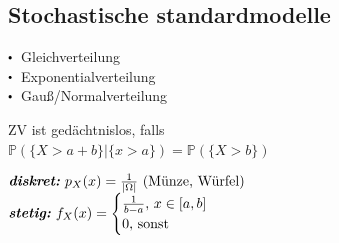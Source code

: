\documentclass[8pt,a4paper,landscape]{extarticle}
\begin{document}
\begin{multicols*}{6}
\section{Stochastische standardmodelle}
%
\vspace{-5pt}
{
\par
$\sbullet$ Gleichverteilung \\
$\sbullet$ Exponentialverteilung \\
$\sbullet$ Gauß/Normalverteilung \\
}
%
\vspace{35pt}
\par
ZV ist gedächtnislos, falls \\ {\color{orange} $\mathbb{P}(\{X > a + b\} | \{x > a\}) = \mathbb{P}(\{X > b\})$}








\columnbreak
\vspace*{-10pt}
\par\noindent 
{}
%
\vspace*{6pt}
\par
  \begingroup
    \setlength{\fboxsep}{1.5pt}
      \begin{varwidth}{\dimexpr{}\fboxsep\relax} 
        \ensuremath{   
        \begin{array}{lll}
        \hspace*{-5pt}
        \text{\textbf{\textit{diskret:}}} \ 
        p_X(x) = \frac{1}{|\Omega|} \ 
        \text{(Münze, Würfel)} \\
        
        \hspace*{-5pt}
        \text{\textbf{\textit{stetig:}}} \ 
        f_X(x) = \begin{cases} 
        \frac{1}{b-a} \text{, } x \in [a, b] \\ 
        0 \text{, sonst} 
        \end{cases}   
        

\end{array}}
\end{varwidth}
\end{multicols*}
\end{document}
